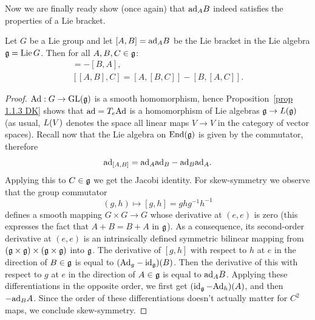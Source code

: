 Now we are finally ready show (once again) that $\mathrm{ad}_A B$ indeed satisfies the properties of a Lie bracket.

\begin{thm}
    Let $G$ be a Lie group and let $[A,B]=\mathrm{ad}_A B$ be the Lie bracket in the Lie algebra $\mathfrak{g}=\operatorname{Lie} G$. Then for all $A,B,C\in\mathfrak{g}$:
    \begin{gather}
        [A,B]=-[B,A],\\
        [[A,B],C]=[A,[B,C]]-[B,[A,C]].
    \end{gather}
\end{thm}
\begin{proof}
    $\mathrm{Ad}:G\to \operatorname{GL}(\mathfrak{g})$ is a smooth homomorphism, hence Proposition~\ref{prop 1.1.3 DK} shows that $\mathrm{ad}=T_e\mathrm{Ad}$ is a homomorphism of Lie algebras $\mathfrak{g}\to \boldsymbol{\mathrm{\mathrm}}{L}(\mathfrak{g})$ (as usual, $\boldsymbol{\mathrm{\mathrm}}{L}(V)$ denotes the space all linear maps $V\to V$ in the category of vector spaces). Recall now that the Lie algebra on $\operatorname{End}(\mathfrak{g})$ is given by the commutator, therefore
    \[\mathrm{ad}_{[A,B]}=\mathrm{ad}_A \mathrm{ad}_B-\mathrm{ad}_B \mathrm{ad}_A.\]
    Applying this to $C\in\mathfrak{g}$ we get the Jacobi identity. For skew-symmetry we observe that the group commutator 
    \[(g,h)\mapsto [g,h]=ghg^{-1}h^{-1}\]
    defines a smooth mapping $G\times G\to G$ whose derivative at $(e,e)$ is zero (this expresses the fact that $A+B=B+A$ in $\mathfrak{g}$). As a consequence, its second-order derivative at $(e,e)$ is an intrinsically defined symmetric bilinear mapping from $(\mathfrak{g}\times\mathfrak{g})\times(\mathfrak{g}\times\mathfrak{g})$ into $\mathfrak{g}$. The derivative of $[g,h]$ with respect to $h$ at $e$ in the direction of $B\in\mathfrak{g}$ is equal to $(\mathrm{Ad}_g-\operatorname{id}_{\mathfrak{g}})(B)$. Then the derivative of this with respect to $g$ at $e$ in the direction of $A\in\mathfrak{g}$ is equal to $\mathrm{ad}_A B$. Applying these differentiations in the opposite order, we first get $(\operatorname{id}_{\mathfrak{g}}-\mathrm{Ad}_h)(A)$, and then $-\mathrm{ad}_B A$. Since the order of these differentiations doesn't actually matter for $C^2$ maps, we conclude skew-symmetry.
\end{proof}


